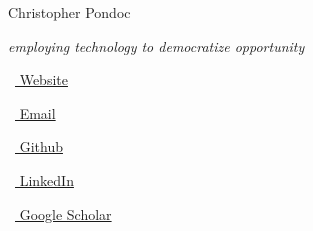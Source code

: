 \begin{scriptsize}
\end{scriptsize}

\vspace*{-0.10em}
\begin{Large} 
	Christopher Pondoc
\end{Large}

\emph{employing technology to democratize opportunity}

\begin{footnotesize}
	\begin{tiny}\faHome\end{tiny}~\href{http://chrispondoc.com/}{
		Website
	}
	\quad \begin{tiny}\faEnvelope[regular]\end{tiny}~\href{mailto:clpondoc@stanford.edu}{%
		Email
	} 
	\quad \begin{tiny}\faMobile*\end{tiny}~\href{https://github.com/cpondoc}{
		Github
	} 
	\quad 
	\begin{tiny}\faLinkedinIn\end{tiny}~\href{https://www.linkedin.com/in/pondoc}{
		LinkedIn
	}
	\quad 
	\begin{tiny}\faGraduationCap\end{tiny}~\href{https://scholar.google.com/citations?user=9SLlqYkAAAAJ&hl=en}{
		 Google Scholar
		}

\end{footnotesize}